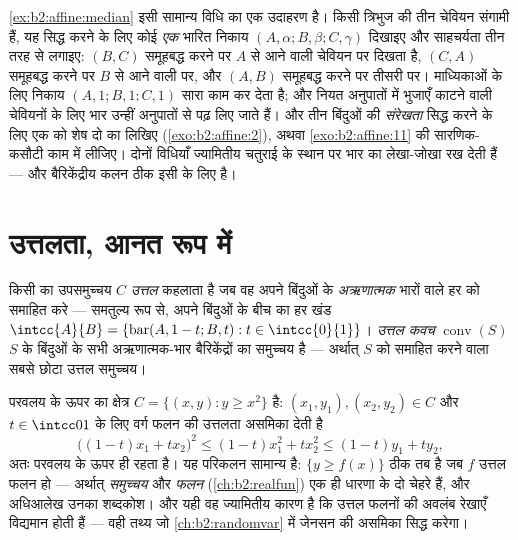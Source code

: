 \begin{remark}[विधि: बैरिकेंद्रों से संगामिता और संरेखता]
\cref{ex:b2:affine:median} इसी सामान्य विधि का एक उदाहरण है। किसी त्रिभुज की तीन चेवियन संगामी
हैं, यह सिद्ध करने के लिए कोई \emph{एक} भारित निकाय $(A,
\alpha; B, \beta; C, \gamma)$ दिखाइए और
साहचर्यता तीन तरह से लगाइए: $(B, C)$ समूहबद्ध करने पर  $A$ से आने
वाली चेवियन पर दिखता है, $(C, A)$ समूहबद्ध करने पर $B$ से आने वाली पर, और $(A, B)$
समूहबद्ध करने पर तीसरी पर। माध्यिकाओं के लिए निकाय $(A, 1; B, 1; C, 1)$ सारा काम कर देता
है; और नियत अनुपातों में भुजाएँ काटने वाली चेवियनों के लिए भार उन्हीं
अनुपातों से पढ़ लिए जाते हैं। और तीन बिंदुओं की \emph{संरेखता} सिद्ध करने
के लिए एक को शेष दो का  लिखिए (\cref{exo:b2:affine:2}), अथवा \cref{exo:b2:affine:11} की सारणिक-कसौटी
काम में लीजिए। दोनों विधियाँ ज्यामितीय चतुराई के स्थान पर भार का लेखा-जोखा
रख देती हैं --- और बैरिकेंद्रीय कलन ठीक इसी के लिए है।
\end{remark}

\section{उत्तलता, आनत रूप में}

\begin{definition}\label{def:b2:affine:convex}
किसी  का उपसमुच्चय $C$ \emph{उत्तल} कहलाता
है जब वह अपने बिंदुओं के \emph{अऋणात्मक} भारों वाले हर  को
समाहित करे --- समतुल्य रूप से, अपने बिंदुओं के बीच का हर खंड $\intcc{A}{B} = \{\operatorname{bar}(A,
1-t; B, t) : t \in \intcc{0}{1}\}$।
\emph{उत्तल कवच} $\operatorname{conv}(S)$ $S$ के बिंदुओं के सभी अऋणात्मक-भार
बैरिकेंद्रों का समुच्चय है --- अर्थात् $S$ को समाहित करने वाला सबसे छोटा
उत्तल समुच्चय।
\end{definition}

\begin{example}[अधिआलेख उत्तल समुच्चय होते हैं]\label{ex:b2:affine:epigraph}
परवलय के ऊपर का क्षेत्र $C = \{(x, y) : y \geq x^2\}$  है: $(x_1, y_1), (x_2, y_2) \in C$ और $t \in
\intcc01$ के लिए वर्ग फलन की
उत्तलता असमिका देती है
\[
\bigl((1-t)x_1 + tx_2\bigr)^2 \leq (1-t)x_1^2 + tx_2^2
\leq (1-t)y_1 + ty_2 ,
\]
अतः  परवलय के ऊपर ही रहता है। यह परिकलन सामान्य है: $\{y \geq f(x)\}$ ठीक तब
 है जब $f$ उत्तल फलन हो --- अर्थात्  \emph{समुच्चय} और 
\emph{फलन} (\cref{ch:b2:realfun}) एक ही धारणा के दो चेहरे हैं, और अधिआलेख उनका शब्दकोश। और
यही वह ज्यामितीय कारण है कि उत्तल फलनों की अवलंब रेखाएँ विद्यमान होती हैं
--- वही तथ्य जो \cref{ch:b2:randomvar} में जेनसन की असमिका सिद्ध करेगा।
\end{example}

